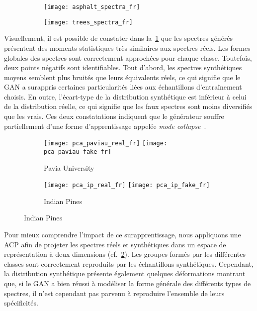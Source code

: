 \begin{figure}
\begin{subfigure}{0.5\textwidth}
\texttt{[image: asphalt\_spectra\_fr]}
\end{subfigure}%
\begin{subfigure}{0.5\textwidth}
\texttt{[image: trees\_spectra\_fr]}
\end{subfigure}
\label{fig:mean_spectra}
\end{figure}

Visuellement, il est possible de constater dans la~\cref{fig:mean_spectra} que les spectres générés présentent des moments statistiques très similaires aux spectres réels. Les formes globales des spectres sont correctement approchées pour chaque classe. Toutefois, deux points négatifs sont identifiables. Tout d'abord, les spectres synthétiques moyens semblent plus bruités que leurs équivalents réels, ce qui signifie que le \gls{GAN} a surappris certaines particularités liées aux échantillons d'entraînement choisis. En outre, l'écart-type de la distribution synthétique est inférieur à celui de la distribution réelle, ce qui signifie que les faux spectres sont moins diversifiés que les vrais. Ces deux constatations indiquent que le générateur souffre partiellement d'une forme d'apprentissage appelée \emph{mode collapse}~\cite{salimans_improved_2016}.

\begin{figure}[t]
\begin{subfigure}{\textwidth}
\texttt{[image: pca\_paviau\_real\_fr]}%
\texttt{[image: pca\_paviau\_fake\_fr]}%
\caption{Pavia University}
\end{subfigure}
\begin{subfigure}{\textwidth}
\texttt{[image: pca\_ip\_real\_fr]}%
\texttt{[image: pca\_ip\_fake\_fr]}%
\caption{Indian Pines}
\end{subfigure}
\label{fig:pca}
\end{figure}

Pour mieux comprendre l'impact de ce surapprentissage, nous appliquons une \gls{ACP} afin de projeter les spectres réels et synthétiques dans un espace de représentation à deux dimensions (cf.~\cref{fig:pca}). Les groupes formés par les différentes classes sont correctement reproduits par les échantillons synthétiques. Cependant, la distribution synthétique présente également quelques déformations montrant que, si le \gls{GAN} a bien réussi à modéliser la forme générale des différents types de spectres, il n'est cependant pas parvenu à reproduire l'ensemble de leurs spécificités.

